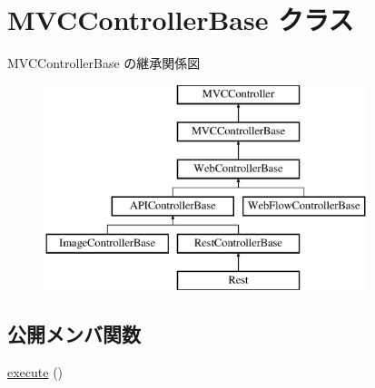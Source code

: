 \hypertarget{class_m_v_c_controller_base}{}\section{M\+V\+C\+Controller\+Base クラス}
\label{class_m_v_c_controller_base}
M\+V\+C\+Controller\+Base の継承関係図\begin{figure}[H]
\begin{center}
\leavevmode
\includegraphics[height=6.000000cm]{class_m_v_c_controller_base}
\end{center}
\end{figure}
\subsection*{公開メンバ関数}
\begin{DoxyCompactItemize}
\item 
\hyperlink{class_m_v_c_controller_base_a333dc4807e54360e6ca3966563f8bc56}{execute} ()
\end{DoxyCompactItemize}
